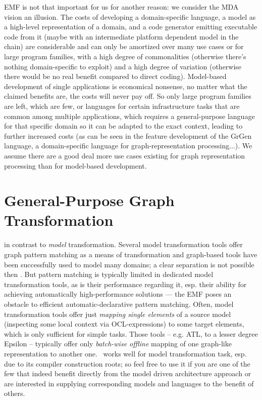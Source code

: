 EMF is not that important for us for another reason: we consider the MDA vision an illusion.
The costs of developing a domain-specific language, a model as a high-level representation of a domain, and a code generator emitting executable code from it (maybe with an intermediate platform dependent model in the chain) are considerable and can only be amortized over many use cases or for large program families, with a high degree of commonalities (otherwise there's nothing domain-specific to exploit) and a high degree of variation (otherwise there would be no real benefit compared to direct coding).
Model-based development of single applications is economical nonsense, no matter what the claimed benefits are, the costs will never pay off.
So only large program families are left, which are few, or languages for certain infrastructure tasks that are common among multiple applications, which requires a general-purpose language for that specific domain so it can be adapted to the exact context, leading to further increased costs (as can be seen in the feature development of the GrGen language, a domain-specific language for graph-representation processing...).
We assume there are a good deal more use cases existing for graph representation processing than for model-based development.

\section{General-Purpose Graph Transformation}
in contrast to \emph{model} transformation.
Several model transformation tools offer graph pattern matching as a means of transformation and graph-based tools have been successfully used to model many domains; a clear separation is not possible then \cite{Jakumeit2013}.
But pattern matching is typically limited in dedicated model transformation tools, as is their performance regarding it, esp. their ability for achieving automatically high-performance solutions --- the EMF poses an obstacle to efficient automatic-declarative pattern matching.
Often, model transformation tools offer just \emph{mapping single elements} of a source model (inspecting some local context via OCL-expressions) to some target elements, which is only sufficient for simple tasks.
Those tools -- e.g. ATL\cite{atl}, to a lesser degree Epsilon\cite{epsilon} -- typically offer only \emph{batch-wise offline} mapping of one graph-like representation to another one.
\GrG\ works well for model transformation task, esp. due to its compiler construction roots; so feel free to use it if you are one of the few that indeed benefit directly from the model driven architecture approach or are interested in supplying corresponding models and languages to the benefit of others. 

